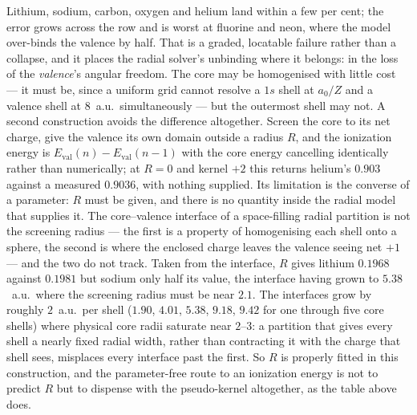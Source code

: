 \documentclass[11pt]{article}
\begin{document}
Lithium, sodium, carbon, oxygen and helium land within a few per cent; the error grows across the
row and is worst at fluorine and neon, where the model over-binds the valence by half. That is a
graded, locatable failure rather than a collapse, and it places the radial solver's unbinding where
it belongs: in the loss of the \emph{valence}'s angular freedom. The core may be homogenised with
little cost --- it must be, since a uniform grid cannot resolve a $1s$ shell at $a_0/Z$ and a
valence shell at $8$~a.u.\ simultaneously --- but the outermost shell may not. A second construction avoids the difference altogether. Screen the core to its net
charge, give the valence its own domain outside a radius $R$, and the ionization energy is
$E_{\mathrm{val}}(n) - E_{\mathrm{val}}(n-1)$ with the core energy cancelling identically rather
than numerically; at $R=0$ and kernel $+2$ this returns helium's $0.903$ against a measured
$0.9036$, with nothing supplied. Its limitation is the converse of a parameter: $R$ must be given,
and there is no quantity inside the radial model that supplies it. The core--valence interface of a
space-filling radial partition is not the screening radius --- the first is a property of
homogenising each shell onto a sphere, the second is where the enclosed charge leaves the valence
seeing net $+1$ --- and the two do not track. Taken from the interface, $R$ gives lithium
$0.1968$ against $0.1981$ but sodium only half its value, the interface having grown to $5.38$~a.u.\
where the screening radius must be near $2.1$. The interfaces grow by roughly $2$~a.u.\ per shell
($1.90$, $4.01$, $5.38$, $9.18$, $9.42$ for one through five core shells) where physical core radii
saturate near $2$--$3$: a partition that gives every shell a nearly fixed radial width, rather than
contracting it with the charge that shell sees, misplaces every interface past the first. So $R$ is
properly fitted in this construction, and the parameter-free route to an ionization energy is not to
predict $R$ but to dispense with the pseudo-kernel altogether, as the table above does.
\end{document}
